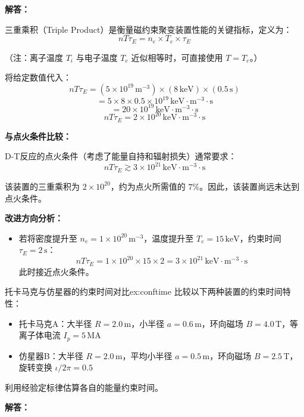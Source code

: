 \textbf{解答：}

三重乘积（Triple Product）是衡量磁约束聚变装置性能的关键指标，定义为：
\begin{equation}
    nT\tau_E = n_e \times T_e \times \tau_E
\label{eq:ch10-triple-product}
\end{equation}

（注：离子温度 $T_i$ 与电子温度 $T_e$ 近似相等时，可直接使用 $T=T_e$。）

将给定数值代入：
\[
    nT\tau_E = (5\times10^{19}\,\mathrm{m^{-3}}) \times (8\,\mathrm{keV}) \times (0.5\,\mathrm{s})
\]
\[
    = 5\times8\times0.5 \times 10^{19}\,\mathrm{keV\cdot m^{-3}\cdot s}
\]
\[
    = 20 \times 10^{19}\,\mathrm{keV\cdot m^{-3}\cdot s}
\]
\[
    \boxed{nT\tau_E = 2\times10^{20}\,\mathrm{keV\cdot m^{-3}\cdot s}}
\]

\textbf{与点火条件比较：}

D-T反应的点火条件（考虑了能量自持和辐射损失）通常要求：
\[
    nT\tau_E \gtrsim 3\times10^{21}\,\mathrm{keV\cdot m^{-3}\cdot s}
\]

该装置的三重乘积为 $2\times10^{20}$，约为点火所需值的 $7\%$。因此，该装置尚远未达到点火条件。

\textbf{改进方向分析：}
\begin{itemize}
    \item 若将密度提升至 $n_e=1\times10^{20}\,\mathrm{m^{-3}}$，温度提升至 $T_e=15\,\mathrm{keV}$，约束时间 $\tau_E=2\,\mathrm{s}$：
    \[
        nT\tau_E = 1\times10^{20}\times15\times2 = 3\times10^{21}\,\mathrm{keV\cdot m^{-3}\cdot s}
    \]
    此时接近点火条件。
\end{itemize}


\begin{example}{托卡马克与仿星器的约束时间对比}{ex:conftime}
比较以下两种装置的约束时间特性：
\begin{itemize}
    \item 托卡马克A：大半径 $R=2.0\,\mathrm{m}$，小半径 $a=0.6\,\mathrm{m}$，环向磁场 $B=4.0\,\mathrm{T}$，等离子体电流 $I_p=5\,\mathrm{MA}$
    \item 仿星器B：大半径 $R=2.0\,\mathrm{m}$，平均小半径 $a=0.5\,\mathrm{m}$，环向磁场 $B=2.5\,\mathrm{T}$，旋转变换 $\iota/2\pi = 0.5$
\end{itemize}
利用经验定标律估算各自的能量约束时间。
\end{example}

\textbf{解答：}

